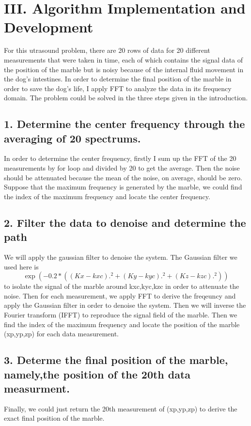 \documentclass[12pt,letterpaper]{article}
\begin{document}
\section*{III. Algorithm Implementation and Development}
For this utrasound problem, there are 20 rows of data for 20 different measurements that were taken in time, each of which contains the signal data of the position of the marble but is noisy because of the internal fluid movement in the dog's intestines. In order to determine the final position of the marble in order to save the dog's life, I apply FFT to analyze the data in its frequency domain. The problem could be solved in the three steps given in the introduction.
\subsection*{1. Determine the center frequency through the averaging of 20 spectrums. }
In order to determine the center frequency, firstly I sum up the FFT of the 20 measurements by for loop and divided by 20 to get the average. Then the noise should be attenuated because the mean of the noise, on average, should be zero. Suppose that the maximum frequency is generated by the marble, we could find the index of the maximum frequency and locate the center frequency. 
\subsection*{2. Filter the data to denoise and determine the path}
We will apply the gaussian filter to denoise the system. The Gaussian filter we used here is 
$$ \exp(-0.2*((Kx-kxc).^2+(Ky-kyc).^2+(Kz-kzc).^2))$$
to isolate the signal of the marble around kxc,kyc,kzc in order to attenuate the noise. Then for each measurement, we apply FFT to derive the freqeuncy and apply the Gaussian filter in order to denoise the system. Then we will inverse the Fourier transform (IFFT) to reproduce the signal field of the marble. Then we find the index of the maximum frequency and locate the position of the marble (xp,yp,zp) for each data measurement. 
\subsection*{3. Determe the final position of the marble, namely,the position of the 20th data measurment.}
Finally, we could just return the 20th measurement of (xp,yp,zp) to derive the exact final position of the marble. 
\end{document}
